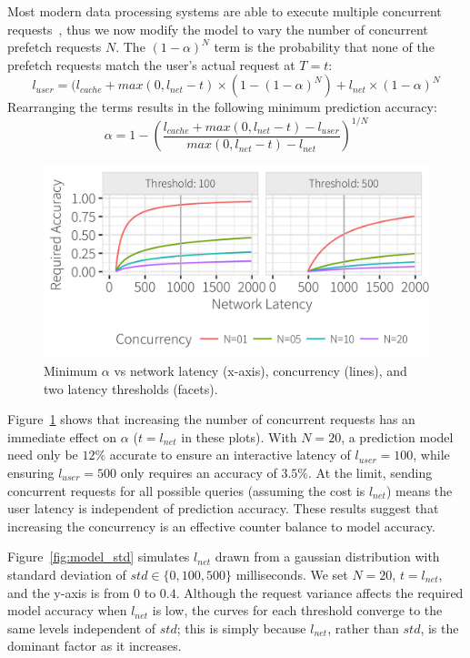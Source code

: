 Most modern data processing systems are able to execute multiple concurrent requests~\cite{ebenstein2016fluxquery,giannikis2012shareddb}, thus we now modify the model to vary the number of concurrent prefetch requests $N$.
The $(1-\alpha)^N$ term is the probability that none of the prefetch requests match the user's actual request at $T=t$:
%
$$l_{user} = (l_{cache} + max(0, l_{net} - t)\times (1-(1-\alpha)^N) + l_{net}\times(1-\alpha)^N $$
%
Rearranging the terms results in the following minimum prediction accuracy:
%
$$\alpha = 1 - \left(\frac{l_{cache}+max(0,l_{net}-t)-l_{user}}{max(0,l_{net}-t)-l_{net}}\right)^{1/N}$$

\begin{figure}[h]
	\centering
	\includegraphics[width=1\columnwidth]{figures/model_concurrency}
 	\caption{Minimum $\alpha$ vs network latency (x-axis), concurrency (lines), and two latency thresholds (facets).}
  \label{fig:model_concurrency}
\end{figure}


Figure~\ref{fig:model_concurrency} shows that increasing the number of concurrent requests has an immediate effect on $\alpha$ ($t=l_{net}$ in these plots).    With $N=20$, a prediction model need only be $12\%$ accurate to ensure an interactive latency of $l_{user}=100$, while ensuring  $l_{user}=500$ only requires an accuracy of $3.5\%$.  At the limit, sending concurrent requests for all possible queries (assuming the cost is $l_{net}$) means the user latency is independent of prediction accuracy.  These results suggest that increasing the concurrency is an effective counter balance to model accuracy.


Figure~\ref{fig:model_std} simulates $l_{net}$ drawn from a gaussian distribution with standard deviation of $std \in \{0, 100, 500\}$ milliseconds.  We set $N=20$, $t=l_{net}$, and the y-axis is from 0 to $0.4$.  Although the request variance affects the required model accuracy when $l_{net}$ is low, the curves for each threshold converge to the same levels independent of $std$; this is simply because $l_{net}$, rather than $std$, is the dominant factor as it increases.

